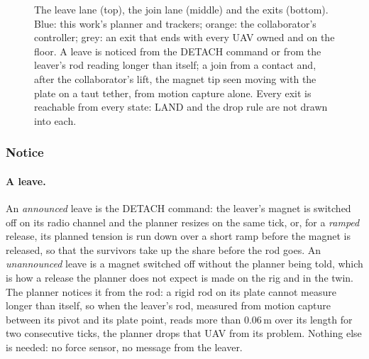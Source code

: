\begin{figure}[htbp]
\caption[Leave and join lanes and their exits]{The leave lane (top), the join lane (middle) and the exits
(bottom). Blue: this work's planner and trackers; orange: the collaborator's controller; grey: an exit that ends
with every UAV owned and on the floor. A leave is noticed from the DETACH command or from the leaver's rod reading
longer than itself; a join from a contact and, after the collaborator's lift, the magnet tip seen moving with the
plate on a taut tether, from motion capture alone. Every exit is reachable from every state: LAND and the drop rule
are not drawn into each.}
\label{fig:reconfig_states}
\end{figure}

\subsubsection{Notice}

\paragraph{A leave.} An \emph{announced} leave is the DETACH command: the leaver's magnet is switched off on its
radio channel and the planner resizes on the same tick, or, for a \emph{ramped} release, its planned tension is run
down over a short ramp before the magnet is released, so that the survivors take up the share before the rod goes.
An \emph{unannounced} leave is a magnet switched off without the planner being told, which is how a release the
planner does not expect is made on the rig and in the twin. The planner notices it from the rod: a rigid rod on its
plate cannot measure longer than itself, so when the leaver's rod, measured from motion capture between its pivot
and its plate point, reads more than 0.06\,m over its length for two consecutive ticks, the planner drops that UAV
from its problem. Nothing else is needed: no force sensor, no message from the leaver.

